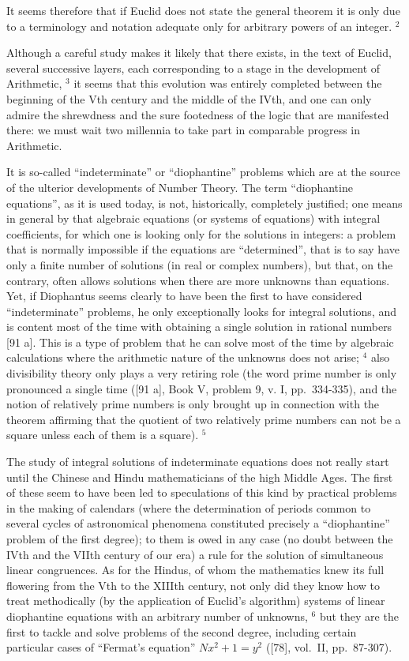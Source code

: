 It seems therefore that if Euclid does not state the general theorem it is only due to a terminology and notation adequate only for arbitrary powers of an integer. \(^{2}\)

Although a careful study makes it likely that there exists, in the text of Euclid, several successive layers, each corresponding to a stage in the development of Arithmetic, \(^{3}\) it seems that this evolution was entirely completed between the beginning of the Vth century and the middle of the IVth, and one can only admire the shrewdness and the sure footedness of the logic that are manifested there: we must wait two millennia to take part in comparable progress in Arithmetic.

It is so-called ``indeterminate'' or ``diophantine'' problems which are at the source of the ulterior developments of Number Theory. The term ``diophantine equations'', as it is used today, is not, historically, completely justified; one means in general by that algebraic equations (or systems of equations) with integral coefficients, for which one is looking only for the solutions in integers: a problem that is normally impossible if the equations are ``determined'', that is to say have only a finite number of solutions (in real or complex numbers), but that, on the contrary, often allows solutions when there are more unknowns than equations. Yet, if Diophantus seems clearly to have been the first to have considered ``indeterminate'' problems, he only exceptionally looks for integral solutions, and is content most of the time with obtaining a single solution in rational numbers {[}91 a{]}. This is a type of problem that he can solve most of the time by algebraic calculations where the arithmetic nature of the unknowns does not arise; \(^{4}\) also divisibility theory only plays a very retiring role (the word prime number is only pronounced a single time ({[}91 a{]}, Book V, problem 9, v. I, pp.~334-335), and the notion of relatively prime numbers is only brought up in connection with the theorem affirming that the quotient of two relatively prime numbers can not be a square unless each of them is a square). \(^{5}\)

The study of integral solutions of indeterminate equations does not really start until the Chinese and Hindu mathematicians of the high Middle Ages. The first of these seem to have been led to speculations of this kind by practical problems in the making of calendars (where the determination of periods common to several cycles of astronomical phenomena constituted precisely a ``diophantine'' problem of the first degree); to them is owed in any case (no doubt between the IVth and the VIIth century of our era) a rule for the solution of simultaneous linear congruences. As for the Hindus, of whom the mathematics knew its full flowering from the Vth to the XIIIth century, not only did they know how to treat methodically (by the application of Euclid's algorithm) systems of linear diophantine equations with an arbitrary number of unknowns, \(^{6}\) but they are the first to tackle and solve problems of the second degree, including certain particular cases of ``Fermat's equation'' \(Nx^{2} + 1 = y^{2}\) ({[}78{]}, vol.~II, pp.~87-307).

